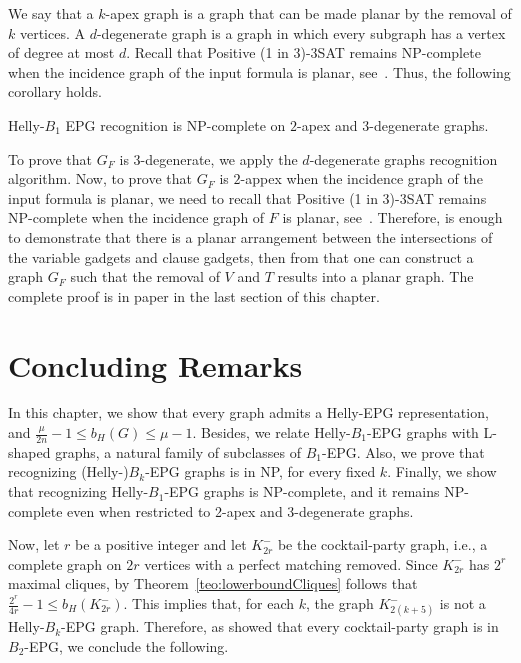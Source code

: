 We say that a $k$-apex graph is a graph that can be made planar by the removal of $k$ vertices. A $d$-degenerate graph is a graph in which every subgraph has a vertex of degree at most $d$. Recall that {\sc Positive (1 in 3)-3SAT} remains NP-complete when the incidence graph of the input formula is planar, see~\cite{mulzer2008minimum}. Thus, the following corollary holds.

\begin{corollary}\label{coro:2apexAnd3degenerate}
{\sc Helly-$B_1$ EPG recognition} is NP-complete on $2$-apex and $3$-degenerate graphs.
\end{corollary}

To prove that $G_F$ is 3-degenerate, we apply the $d$-degenerate graphs recognition algorithm. Now, to prove that $G_F$ is $2$-appex when the incidence graph of the input formula is planar, we need to recall that {\sc Positive (1 in 3)-3SAT} remains NP-complete when the incidence graph of $F$ is planar, see~\cite{mulzer2008minimum}. Therefore, is enough to demonstrate that there is a planar arrangement between the intersections of the variable gadgets and clause gadgets, then from that one can construct a graph $G_F$ such that the removal of $V$ and $T$ results into a planar graph. The complete proof is in paper in the last section of this chapter.


\section{Concluding Remarks}

In this chapter, we show that every graph admits a Helly-EPG representation, and $\frac{\mu}{2n}-1\leq b_H(G)\leq \mu -1$. Besides, we relate Helly-$B_1$-EPG graphs with L-shaped graphs, a natural family of subclasses of $B_1$-EPG. Also, we prove that recognizing (Helly-)$B_k$-EPG graphs is in NP, for every fixed $k$. Finally, we show that recognizing Helly-$B_1$-EPG graphs is NP-complete, and it remains NP-complete even when restricted to 2-apex and 3-degenerate graphs.

Now, let $r$ be a positive integer and let $K_{2r}^-$ be the cocktail-party graph, i.e., a complete graph on $2r$ vertices with a perfect matching removed. Since $K_{2r}^-$ has $2^r$ maximal cliques, by Theorem~\ref{teo:lowerboundCliques} follows that $\frac{2^r}{4r}-1\leq b_H(K_{2r}^-)$. This implies that, for each $k$, the graph $K_{2(k+5)}^-$ is not a Helly-$B_k$-EPG graph. Therefore, as \cite{martin2017} showed that every cocktail-party graph is in $B_2$-EPG, we conclude the following.

